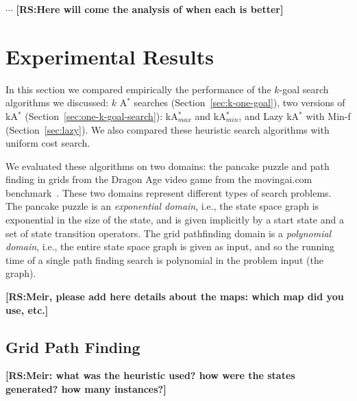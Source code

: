 \documentclass{aicom2e}
\newcommand{\kgs}{$k$-goal search}
\newcommand{\astar}{A$^*$}
\newcommand{\kastar}{kA$^*$}
\newcommand{\kastarmin}{kA$^*_{min}$}
\newcommand{\kastarmax}{kA$^*_{max}$}
\newcommand{\minf}{Min-f}
\newcommand{\roni}[1]{\textbf{[RS:#1]}}
\begin{document}
$\cdots$
\roni{Here will come the analysis of when each is better}






\section{Experimental Results}

In this section we compared empirically the performance of the \kgs{} algorithms we discussed: $k$ \astar{} searches (Section~\ref{sec:k-one-goal}), two versions of \kastar{} (Section~\ref{sec:one-k-goal-search}): \kastarmax{} and \kastarmin{}, and Lazy \kastar{} with \minf{} (Section~\ref{sec:lazy}). We also compared these heuristic search algorithms with uniform cost search. 

We evaluated these algorithms on two domains: the pancake puzzle and path finding in grids from the Dragon Age video game from the movingai.com benchmark~\cite{sturtevant2012benchmarks}. These two domains represent different types of search problems. The pancake puzzle is an {\em exponential domain}, i.e., the state space graph is exponential in the size of the state, and is given implicitly by a start state and a set of state transition operators. The grid pathfinding domain is a {\em polynomial domain}, i.e., the entire state space graph is given as input, and so the running time of a single path finding search is polynomial in the problem input (the graph). 

\roni{Meir, please add here details about the maps: which map did you use, etc.}
\subsection{Grid Path Finding}
\roni{Meir: what was the heuristic used? how were the states generated? how many instances?}
\end{document}
